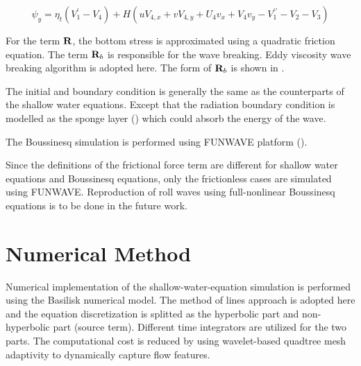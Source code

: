 \documentclass{jfm}
\begin{document}
\begin{equation}
\psi_y =  \eta_t (V_1^{\prime}-V_4) + H \left( u V_{4,x} + v V_{4,y} + U_4 v_x +V_4 v_y - V_1^{\prime \prime} -  V_2 -  V_3 \right) 
\end{equation}

For the term $\bf R$, the bottom stress is approximated using a quadratic friction equation. The term ${\bf{R}}_{b} $ is responsible for the wave breaking. Eddy viscosity wave breaking algorithm is adopted here. The form of ${\bf{R}}_{b} $ is shown in \cite{Kennedy2000}.

The initial and boundary condition is generally the same as the counterparts of the shallow water equations. Except that the radiation boundary condition is modelled as the sponge layer (\cite{Larsen1983}) which could absorb the energy of the wave.



The Boussinesq simulation is performed using FUNWAVE platform (\cite{Shietal2012}).

Since the definitions of the frictional force term are different for shallow water equations and Boussinesq equations, only the frictionless cases are simulated using FUNWAVE. Reproduction of roll waves using full-nonlinear Boussinesq  equations is to be done in the future work.


\section{Numerical Method}
Numerical implementation of the shallow-water-equation simulation is performed using the Basilisk numerical model. The method of lines approach is adopted here and the equation discretization is splitted as the hyperbolic part and non-hyperbolic part (source term). Different time integrators are utilized for the two parts. The computational cost is reduced by using wavelet-based quadtree mesh adaptivity to dynamically capture flow features.
\end{document}
